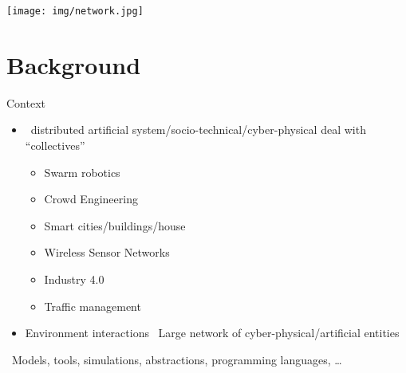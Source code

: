 \documentclass[8pt, aspectratio=169, handout]{beamer}
\begin{document}
\begin{frame}[plain]
  \begin{backgroundblock} 
    \texttt{[image: img/network.jpg]} 
  \end{backgroundblock} 
\titlepage
\end{frame}
\addtocounter{framenumber}{-1}
\section{Background}
\begin{frame}{Context}
  \begin{card}
    \begin{itemize}
      \item {} \faArrowRight \, distributed artificial system/socio-technical/cyber-physical deal with ``collectives''
      \begin{multicols}{2}
      \begin{itemize}
        \item Swarm robotics
        \item Crowd Engineering
        \item Smart cities/buildings/house
      \end{itemize}
      \begin{itemize}
        \item Wireless Sensor Networks
        \item Industry 4.0
        \item Traffic management
      \end{itemize}
      \end{multicols}
      \item Environment interactions \faPlus \, Large network of cyber-physical/artificial entities
    \end{itemize}
  \end{card}
  \begin{alarm}
     \faArrowRight \, Models, tools, simulations, abstractions, programming languages, \dots
  \end{alarm}
\end{frame}
\end{document}
